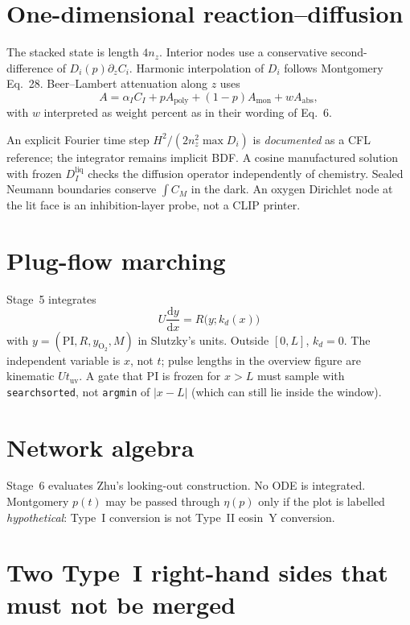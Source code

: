 \section{One-dimensional reaction--diffusion}

The stacked state is length $4n_z$.
Interior nodes use a conservative second-difference of $D_i(p)\partial_z C_i$.
Harmonic interpolation of $D_i$ follows Montgomery Eq.~28.
Beer--Lambert attenuation along $z$ uses
\begin{equation}
  A=\alpha_I C_I + p A_{\mathrm{poly}}+(1-p)A_{\mathrm{mon}}+w A_{\mathrm{abs}},
\end{equation}
with $w$ interpreted as weight percent as in their wording of Eq.~6.

An explicit Fourier time step $H^2/(2 n_z^2 \max D_i)$ is \emph{documented} as a CFL reference; the integrator remains implicit BDF.
A cosine manufactured solution with frozen $D_I^{\mathrm{liq}}$ checks the diffusion operator independently of chemistry.
Sealed Neumann boundaries conserve $\int C_M$ in the dark.
An oxygen Dirichlet node at the lit face is an inhibition-layer probe, not a CLIP printer.

\section{Plug-flow marching}

Stage~5 integrates
\begin{equation}
  U\frac{\mathrm{d}y}{\mathrm{d}x}=R\bigl(y;k_d(x)\bigr)
\end{equation}
with $y=(\mathrm{PI},R,y_{\mathrm{O_2}},M)$ in Slutzky's units.
Outside $[0,L]$, $k_d=0$.
The independent variable is $x$, not $t$; pulse lengths in the overview figure are kinematic $U t_{\mathrm{uv}}$.
A gate that PI is frozen for $x>L$ must sample with \texttt{searchsorted}, not \texttt{argmin} of $|x-L|$ (which can still lie inside the window).

\section{Network algebra}

Stage~6 evaluates Zhu's looking-out construction.
No ODE is integrated.
Montgomery $p(t)$ may be passed through $\eta(p)$ only if the plot is labelled \emph{hypothetical}: Type~I conversion is not Type~II eosin~Y conversion.

\section{Two Type~I right-hand sides that must not be merged}

